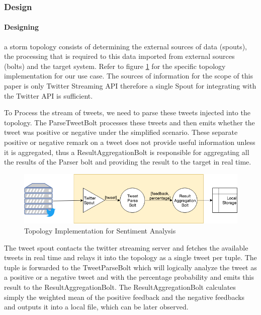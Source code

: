 \documentclass[runningheads,a4paper]{llncs}[2015/06/24]
\begin{document}
\subsubsection{Design}
\paragraph{Designing} a storm topology consists of determining the external sources of data (spouts), the processing that is required to this data imported from external sources (bolts) and the target system. Refer to figure \ref{fig:topoimpl} for the specific topology implementation for our use case. The sources of information for the scope of this paper is only Twitter Streaming API therefore a single Spout for integrating with the Twitter API is sufficient.

To Process the stream of tweets, we need to parse these tweets injected into the topology. The ParseTweetBolt processes these tweets and then emits whether the tweet was positive or negative under the simplified scenario. These separate positive or negative remark on a tweet does not provide useful information unless it is aggregated, thus a ResultAggregationBolt is responsible for aggregating all the results of the Parser bolt and providing the result to the target in real time.

\begin{figure}
  \begin{center}
    \includegraphics[width=.7\textwidth]{topoimpl.png}
    \caption{Topology Implementation for Sentiment Analysis}
    \label{fig:topoimpl}
   \end{center}
\end{figure}

The tweet spout contacts the twitter streaming server and fetches the available tweets in real time and relays it into the topology as a single tweet per tuple. The tuple is forwarded to the TweetParseBolt which will logically analyze the tweet as a positive or a negative tweet and with the percentage probability and emits this result to the ResultAggregationBolt. The ResultAggregationBolt calculates simply the weighted mean of the positive feedback and the negative feedbacks and outputs it into a local file, which can be later observed.
\end{document}
